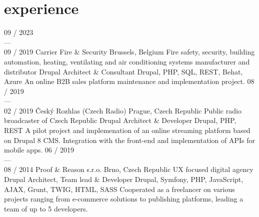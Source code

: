 \documentclass[]{friggeri-cv} %
\begin{document}

\bigskip

\section{experience}
\begin{entrylist}
  \job
  {09 / 2023 \\ --- \\ 09 / 2019}
  {Carrier Fire \& Security}
  {Brussels, Belgium}
  {Fire safety, security, building automation, heating, ventilating and air conditioning systems manufacturer and distributor}
  {
    \position
      {Drupal Architect \& Consultant}
      {Drupal, PHP, SQL, REST, Behat, Azure}
      {
        An online B2B sales platform maintenance and implementation project.
      }
  }
  \job
  {08 / 2019 \\ --- \\ 02 / 2019}
  {Český Rozhlas (Czech Radio)}
  {Prague, Czech Republic}
  {Public radio broadcaster of Czech Republic}
  {
    \position
      {Drupal Architect \& Developer}
      {Drupal, PHP, REST}
      {
        A pilot project and implemenation of an online streaming platform based on Drupal 8 CMS. Integration
        with the front-end and implementation of APIs for mobile apps.
      }
  }
  \job
  {06 / 2019 \\ --- \\ 08 / 2014}
  {Proof \& Reason s.r.o.}
  {Brno, Czech Republic}
  {UX focused digital agency}
  {
  \position
  {Drupal Architect, Team lead \& Developer}
  {Drupal, Symfony, PHP, JavaScript, AJAX, Grunt, TWIG, HTML, SASS}
  {
  Cooperated as a freelancer on various projects ranging from e-commerce solutions to publishing platforms, leading a team of up to 5 developers.
  }%
}
\end{entrylist}
\end{document}
